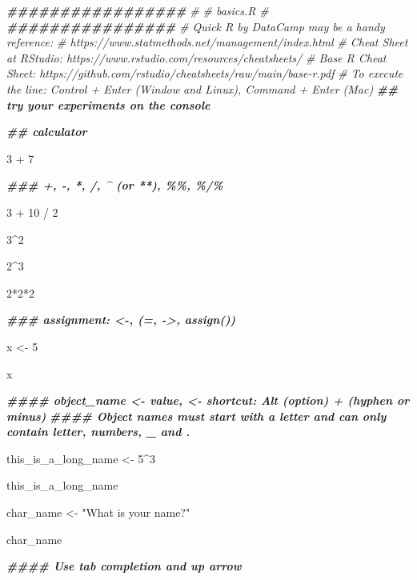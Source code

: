 \documentclass[
]{bxjsbook}
\newenvironment{Shaded}{\begin{snugshade}}{\end{snugshade}}
\newcommand{\CommentTok}[1]{\textcolor[rgb]{0.56,0.35,0.01}{\textit{#1}}}
\newcommand{\DecValTok}[1]{\textcolor[rgb]{0.00,0.00,0.81}{#1}}
\newcommand{\DocumentationTok}[1]{\textcolor[rgb]{0.56,0.35,0.01}{\textbf{\textit{#1}}}}
\newcommand{\NormalTok}[1]{#1}
\newcommand{\OtherTok}[1]{\textcolor[rgb]{0.56,0.35,0.01}{#1}}
\newcommand{\SpecialCharTok}[1]{\textcolor[rgb]{0.00,0.00,0.00}{#1}}
\newcommand{\StringTok}[1]{\textcolor[rgb]{0.31,0.60,0.02}{#1}}
\theoremstyle{definition}
\theoremstyle{definition}
\theoremstyle{definition}
\theoremstyle{definition}
\theoremstyle{remark}
\begin{document}
\begin{Shaded}
\begin{Highlighting}[]
\DocumentationTok{\#\#\#\#\#\#\#\#\#\#\#\#\#\#\#\#\#}
\CommentTok{\#}
\CommentTok{\# basics.R}
\CommentTok{\#}
\DocumentationTok{\#\#\#\#\#\#\#\#\#\#\#\#\#\#\#\#}
\CommentTok{\# \textquotesingle{}Quick R\textquotesingle{} by DataCamp may be a handy reference: }
\CommentTok{\#     https://www.statmethods.net/management/index.html}
\CommentTok{\# Cheat Sheet at RStudio: https://www.rstudio.com/resources/cheatsheets/}
\CommentTok{\# Base R Cheat Sheet: https://github.com/rstudio/cheatsheets/raw/main/base{-}r.pdf}
\CommentTok{\# To execute the line: Control + Enter (Window and Linux), Command + Enter (Mac)}
\DocumentationTok{\#\# try your experiments on the console}

\DocumentationTok{\#\# calculator}

\DecValTok{3} \SpecialCharTok{+} \DecValTok{7}

\DocumentationTok{\#\#\# +, {-}, *, /, \^{} (or **), \%\%, \%/\%}

\DecValTok{3} \SpecialCharTok{+} \DecValTok{10} \SpecialCharTok{/} \DecValTok{2}

\DecValTok{3}\SpecialCharTok{\^{}}\DecValTok{2}

\DecValTok{2}\SpecialCharTok{\^{}}\DecValTok{3}

\DecValTok{2}\SpecialCharTok{*}\DecValTok{2}\SpecialCharTok{*}\DecValTok{2}

\DocumentationTok{\#\#\# assignment: \textless{}{-}, (=, {-}\textgreater{}, assign()) }

\NormalTok{x }\OtherTok{\textless{}{-}} \DecValTok{5}

\NormalTok{x }

\DocumentationTok{\#\#\#\# object\_name \textless{}{-} value, \textquotesingle{}\textless{}{-}\textquotesingle{} shortcut: Alt (option) + \textquotesingle{}{-}\textquotesingle{} (hyphen or minus) }
\DocumentationTok{\#\#\#\# Object names must start with a letter and can only contain letter, numbers, \_ and .}

\NormalTok{this\_is\_a\_long\_name }\OtherTok{\textless{}{-}} \DecValTok{5}\SpecialCharTok{\^{}}\DecValTok{3}

\NormalTok{this\_is\_a\_long\_name}

\NormalTok{char\_name }\OtherTok{\textless{}{-}} \StringTok{"What is your name?"}

\NormalTok{char\_name}

\DocumentationTok{\#\#\#\# Use \textquotesingle{}tab completion\textquotesingle{} and \textquotesingle{}up arrow\textquotesingle{}}


\end{Highlighting}
\end{Shaded}
\end{document}
